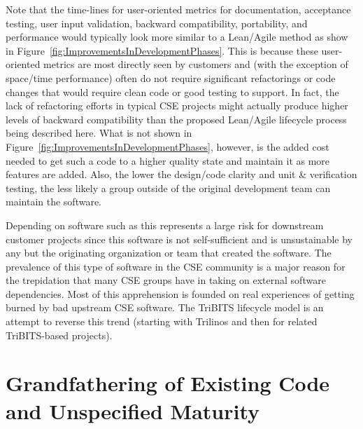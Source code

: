 \documentclass[11pt]{SANDreport}
\begin{document}
Note that the time-lines for user-oriented metrics for documentation, acceptance testing, user input validation, backward compatibility, portability, and performance would typically look more similar to a Lean/Agile method as show in Figure~\ref{fig:ImprovementsInDevelopmentPhases}.  This is because these user-oriented metrics are most directly seen by customers and (with the exception of space/time performance) often do not require significant refactorings or code changes that would require clean code or good testing to support.  In fact, the lack of refactoring efforts in typical CSE projects might actually produce higher levels of backward compatibility than the proposed Lean/Agile lifecycle process being described here.  What is not shown in Figure~\ref{fig:ImprovementsInDevelopmentPhases}, however, is the added cost needed to get such a code to a higher quality state and maintain it as more features are added.  Also, the lower the design/code clarity and unit \& verification testing, the less likely a group outside of the original development team can maintain the software.

Depending on software such as this represents a large risk for downstream customer projects since this software is not self-sufficient and is unsustainable by any but the originating organization or team that created the software.  The prevalence of this type of software in the CSE community is a major reason for the trepidation that many CSE groups have in taking on external software dependencies.  Most of this apprehension is founded on real experiences of getting burned by bad upstream CSE software.  The TriBITS lifecycle model is an attempt to reverse this trend (starting with Trilinos and then for related TriBITS-based projects).


%
{}\section{Grandfathering of Existing Code and Unspecified Maturity}
\label{sec:grandfathering}
%
\end{document}
